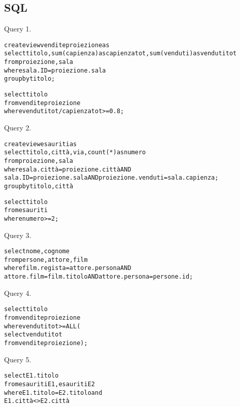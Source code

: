 \documentclass[11pt]{article}
\begin{document}
\subsection{SQL}

Query 1.
\begin{alltt}
create view venditeproiezione as
  select titolo, sum(capienza) as capienzatot, sum(venduti) as vendutitot
  from proiezione, sala
  where sala.ID=proiezione.sala
  group by titolo;

select titolo
from venditeproiezione
where vendutitot/capienzatot>=0.8;
\end{alltt}

Query 2.
\begin{alltt}
create view esauriti as
  select titolo, citt\`a, via, count(*) as numero
  from proiezione, sala
  where sala.citt\`a=proiezione.citt\`a AND
      sala.ID=proiezione.sala AND proiezione.venduti=sala.capienza;
  group by titolo, citt\`a

select titolo
from esauriti
where numero>=2;
\end{alltt}

Query 3.
\begin{alltt}
select nome, cognome
from persone, attore, film
where film.regista=attore.persona AND
    attore.film=film.titolo AND attore.persona=persone.id;
\end{alltt}

Query 4.
\begin{alltt}

select titolo
from venditeproiezione
where vendutitot >= ALL (
select vendutitot
from venditeproiezione);
\end{alltt}


Query 5.
\begin{alltt}

select E1.titolo
from esauriti E1, esauriti E2
where E1.titolo=E2.titolo and
      E1.citt\`a <> E2.citt\`a
\end{alltt}
\end{document}
